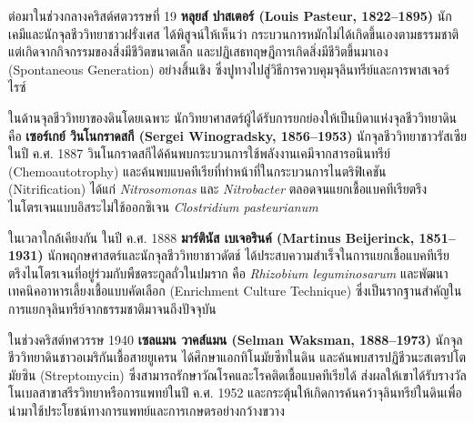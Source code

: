 ต่อมาในช่วงกลางคริสต์ศตวรรษที่ 19 \textbf{หลุยส์ ปาสเตอร์ (Louis Pasteur, 1822--1895)} นักเคมีและนักจุลชีววิทยาชาวฝรั่งเศส ได้พิสูจน์ให้เห็นว่า กระบวนการหมักไม่ได้เกิดขึ้นเองตามธรรมชาติ แต่เกิดจากกิจกรรมของสิ่งมีชีวิตขนาดเล็ก และปฏิเสธทฤษฎีการเกิดสิ่งมีชีวิตขึ้นมาเอง (Spontaneous Generation) อย่างสิ้นเชิง ซึ่งปูทางไปสู่วิธีการควบคุมจุลินทรีย์และการพาสเจอร์ไรซ์

ในด้านจุลชีววิทยาของดินโดยเฉพาะ นักวิทยาศาสตร์ผู้ได้รับการยกย่องให้เป็นบิดาแห่งจุลชีววิทยาดินคือ \textbf{เซอร์เกย์ วินโนกราดสกี (Sergei Winogradsky, 1856--1953)} นักจุลชีววิทยาชาวรัสเซีย ในปี ค.ศ. 1887 วินโนกราดสกีได้ค้นพบกระบวนการใช้พลังงานเคมีจากสารอนินทรีย์ (Chemoautotrophy) และค้นพบแบคทีเรียที่ทำหน้าที่ในกระบวนการไนตริฟิเคชัน (Nitrification) ได้แก่ \textit{Nitrosomonas} และ \textit{Nitrobacter} ตลอดจนแยกเชื้อแบคทีเรียตรึงไนโตรเจนแบบอิสระไม่ใช้ออกซิเจน \textit{Clostridium pasteurianum}

ในเวลาใกล้เคียงกัน ในปี ค.ศ. 1888 \textbf{มาร์ตินัส เบเจอรินค์ (Martinus Beijerinck, 1851--1931)} นักพฤกษศาสตร์และนักจุลชีววิทยาชาวดัตช์ ได้ประสบความสำเร็จในการแยกเชื้อแบคทีเรียตรึงไนโตรเจนที่อยู่ร่วมกับพืชตระกูลถั่วในปมราก คือ \textit{Rhizobium leguminosarum} และพัฒนาเทคนิคอาหารเลี้ยงเชื้อแบบคัดเลือก (Enrichment Culture Technique) ซึ่งเป็นรากฐานสำคัญในการแยกจุลินทรีย์จากธรรมชาติมาจนถึงปัจจุบัน

ในช่วงคริสต์ทศวรรษ 1940 \textbf{เซลแมน วาคส์แมน (Selman Waksman, 1888--1973)} นักจุลชีววิทยาดินชาวอเมริกันเชื้อสายยูเครน ได้ศึกษาแอกทิโนมัยซีทในดิน และค้นพบสารปฏิชีวนะสเตรปโตมัยซิน (Streptomycin) ซึ่งสามารถรักษาวัณโรคและโรคติดเชื้อแบคทีเรียได้ ส่งผลให้เขาได้รับรางวัลโนเบลสาขาสรีรวิทยาหรือการแพทย์ในปี ค.ศ. 1952 และกระตุ้นให้เกิดการค้นคว้าจุลินทรีย์ในดินเพื่อนำมาใช้ประโยชน์ทางการแพทย์และการเกษตรอย่างกว้างขวาง

